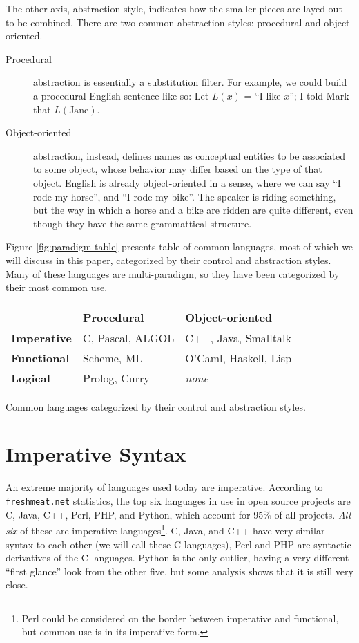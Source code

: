 \documentclass[12pt]{article}
\begin{document}
The other axis, abstraction style, indicates how the smaller pieces are
layed out to be combined.  There are two common abstraction styles:
procedural and object-oriented.

\begin{description}
\item[Procedural] abstraction is essentially a substitution filter.  For
example, we could build a procedural English sentence like so: Let
$\mathit{L}(x)$ = ``I like $x$''; I told Mark that $L(\text{Jane})$.
\item[Object-oriented] abstraction, instead, defines names as conceptual
entities to be associated to some object, whose behavior may differ
based on the type of that object.  English is already object-oriented in
a sense, where we can say ``I rode my horse'', and ``I rode my bike''.
The speaker is riding something, but the way in which a horse and a bike
are ridden are quite different, even though they have the same
grammattical structure.
\end{description}

Figure \ref{fig:paradigm-table} presents table of common languages, most
of which we will discuss in this paper, categorized by their control and
abstraction styles.  Many of these languages are multi-paradigm, so they
have been categorized by their most common use.

\begin{Figure}
\label{fig:paradigm-table}
\begin{tabular}{l|ll}
                      & \textbf{Procedural}  & \textbf{Object-oriented} \\
  \hline
  \textbf{Imperative} & C, Pascal, ALGOL     & C++, Java, Smalltalk \\
  \textbf{Functional} & Scheme, ML           & O'Caml, Haskell, Lisp \\
  \textbf{Logical}    & Prolog, Curry        & \textit{none} \\
\end{tabular}
\caption{Common languages categorized by their control and abstraction
styles.} 
\end{Figure}

\section{Imperative Syntax}

An extreme majority of languages used today are imperative.  According
to \texttt{freshmeat.net} statistics\cite{Welton-2004}, the top six
languages in use in open source projects are C, Java, C++, Perl, PHP,
and Python, which account for 95\% of all projects.  \textit{All six} of
these are imperative languages\footnote{Perl could be considered on the
border between imperative and functional, but common use is in its
imperative form.}.  C, Java, and C++ have very similar syntax to each
other (we will call these C languages), Perl and PHP are syntactic
derivatives of the C languages.  Python is the only outlier, having a
very different ``first glance'' look from the other five, but some
analysis shows that it is still very close.
\end{document}
